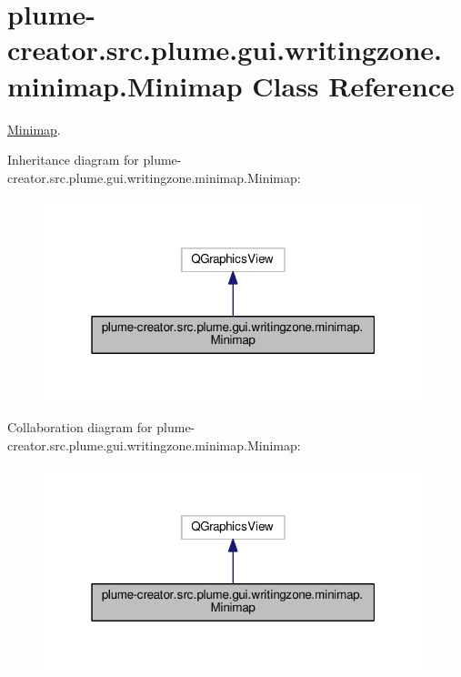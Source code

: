 \hypertarget{classplume-creator_1_1src_1_1plume_1_1gui_1_1writingzone_1_1minimap_1_1_minimap}{}\section{plume-\/creator.src.\+plume.\+gui.\+writingzone.\+minimap.\+Minimap Class Reference}
\label{classplume-creator_1_1src_1_1plume_1_1gui_1_1writingzone_1_1minimap_1_1_minimap}


\hyperlink{classplume-creator_1_1src_1_1plume_1_1gui_1_1writingzone_1_1minimap_1_1_minimap}{Minimap}.  




Inheritance diagram for plume-\/creator.src.\+plume.\+gui.\+writingzone.\+minimap.\+Minimap\+:\nopagebreak
\begin{figure}[H]
\begin{center}
\leavevmode
\includegraphics[width=313pt]{classplume-creator_1_1src_1_1plume_1_1gui_1_1writingzone_1_1minimap_1_1_minimap__inherit__graph}
\end{center}
\end{figure}


Collaboration diagram for plume-\/creator.src.\+plume.\+gui.\+writingzone.\+minimap.\+Minimap\+:\nopagebreak
\begin{figure}[H]
\begin{center}
\leavevmode
\includegraphics[width=313pt]{classplume-creator_1_1src_1_1plume_1_1gui_1_1writingzone_1_1minimap_1_1_minimap__coll__graph}
\end{center}
\end{figure}
